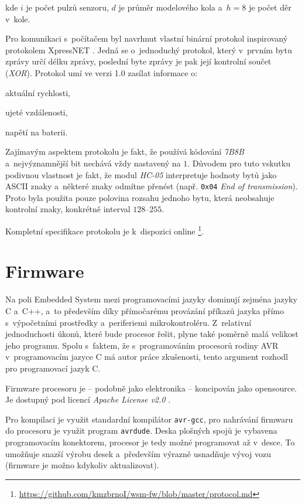 kde $i$ je počet pulzů senzoru, $d$ je průměr modelového kola a~$h = 8$ je
počet děr v~kole.

Pro komunikaci s~počítačem byl navrhnut vlastní binární protokol inspirovaný
protokolem XpressNET \cite{xpressnet-specs}. Jedná se o~jednoduchý protokol,
který v~prvním bytu zprávy určí délku zprávy, poslední byte zprávy je pak její
kontrolní součet (\textit{XOR}). Protokol umí ve verzi 1.0 zasílat informace o:

\begin{compactenum}
\item aktuální rychlosti,
\item ujeté vzdálenosti,
\item napětí na baterii.
\end{compactenum}

Zajímavým aspektem protokolu je fakt, že používá kódování \textit{7B8B}
a~nejvýznamnější bit nechává vždy nastavený na $1$. Důvodem pro tuto vskutku
podivnou vlastnost je fakt, že modul \textit{HC-05} interpretuje hodnoty bytů
jako ASCII znaky a~některé znaky odmítne přenést (např. \texttt{0x04}
\textit{End of transmission}). Proto byla použita pouze polovina rozsahu
jednoho bytu, která neobsahuje kontrolní znaky, konkrétně interval
$128$--$255$.

Kompletní specifikace protokolu je k~dispozici online
\footnote{\url{https://github.com/kmzbrnoI/wsm-fw/blob/master/protocol.md}}.

\section{Firmware}
\label{sec:wsm-fw}

Na poli Embedded System mezi programovacími jazyky dominují zejména jazyky C
a~C++, a~to především díky přímočarému provázání příkazů jazyka přímo
s~výpočetními prostředky a~periferiemi mikrokontroléru. Z~relativní
jednoduchosti úkonů, které bude procesor řešit, plyne také poměrně malá
velikost jeho programu. Spolu s~faktem, že s~programováním procesorů rodiny
AVR v~programovacím jazyce C má autor práce zkušenosti, tento argument rozhodl
pro programovací jazyk C.

Firmware procesoru je -- podobně jako elektronika -- koncipován jako
opensource. Je dostupný pod licencí \textit{Apache License v2.0} \cite{wsm-fw}.

Pro kompilaci je využit standardní kompilátor \texttt{avr-gcc}, pro nahrávání
firmwaru do procesoru je využit program \texttt{avrdude}. Deska
plošných spojů je vybavena programovacím konektorem, procesor je tedy možné
programovat až v~desce. To umožňuje snazší výrobu desek a~především výrazně
usnadňuje vývoj vozu (firmware je možno kdykoliv aktualizovat).

